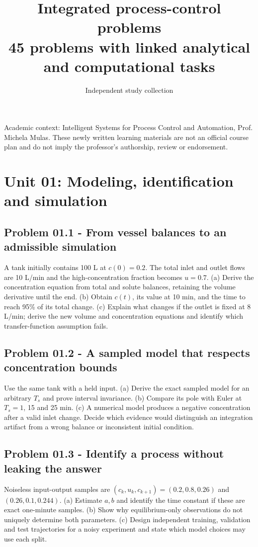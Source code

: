 \documentclass[11pt,a4paper]{article}
\title{Integrated process-control problems\\[4pt]{\large 45 problems with linked analytical and computational tasks}}
\author{Independent study collection}
\date{}
\begin{document}
\maketitle
\noindent Academic context: Intelligent Systems for Process Control and Automation, Prof. Michela Mulas. These newly written learning materials are not an official course plan and do not imply the professor's authorship, review or endorsement.

\tableofcontents\newpage
\clearpage\section{Unit 01: Modeling, identification and simulation}

\subsection{Problem 01.1 - From vessel balances to an admissible simulation}
A tank initially contains 100 L at $c(0)=0.2$. The total inlet and outlet flows are 10 L/min and the high-concentration fraction becomes $u=0.7$. (a) Derive the concentration equation from total and solute balances, retaining the volume derivative until the end. (b) Obtain $c(t)$, its value at 10 min, and the time to reach 95\% of its total change. (c) Explain what changes if the outlet is fixed at 8 L/min; derive the new volume and concentration equations and identify which transfer-function assumption fails.

\subsection{Problem 01.2 - A sampled model that respects concentration bounds}
Use the same tank with a held input. (a) Derive the exact sampled model for an arbitrary $T_s$ and prove interval invariance. (b) Compare its pole with Euler at $T_s=1$, 15 and 25 min. (c) A numerical model produces a negative concentration after a valid inlet change. Decide which evidence would distinguish an integration artifact from a wrong balance or inconsistent initial condition.

\subsection{Problem 01.3 - Identify a process without leaking the answer}
Noiseless input-output samples are $(c_k,u_k,c_{k+1})=(0.2,0.8,0.26)$ and $(0.26,0.1,0.244)$. (a) Estimate $a,b$ and identify the time constant if these are exact one-minute samples. (b) Show why equilibrium-only observations do not uniquely determine both parameters. (c) Design independent training, validation and test trajectories for a noisy experiment and state which model choices may use each split.
\end{document}
